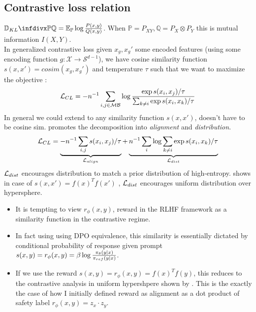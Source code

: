 \documentclass{article}
\begin{document}
\subsection{Contrastive loss relation}
$\infdiv{\mathbb{P}}{\mathbb{Q}}=\E_\mathbb{P}\log\frac{P(x,y)}{Q(x,y)}$. When $\mathbb{P}=P_{XY},\mathbb{Q}=P_X\otimes P_Y$ this is mutual information $I(X,Y)$.\\
In generalized contrastive loss given $x_g,x_g'$ some encoded features (using some encoding function $g:\mathcal{X}\to \mathcal{S}^{d-1}$), we have cosine similarity function $s(x,x')=cosim(x_g,x_g')$ and temperature $\tau$ such that we want to maximize the objective \citep{Chen2020IntriguingLosses}:
\begin{equation}
    \mathcal{L}_{CL}=-n^{-1}\sum_{i,j\in \mathcal{MB}}\log \frac{\exp s(x_i,x_j)/\tau}{\sum_{k\neq i}\exp s(x_i,x_k)/\tau}
\end{equation}
In general we could extend to any similarity function $s(x,x')$, doesn't have to be cosine sim.
\cite{Chen2020IntriguingLosses} promotes the decomposition into \emph{alignment} and \emph{distribution}.
\begin{equation}
    \mathcal{L}_{CL}=\underbrace{-n^{-1}\sum_{i,j}s(x_i,x_j)/\tau}_{\mathcal{L}_{align}} + \underbrace{n^{-1}\sum_i\log \sum_{k\neq i}\exp s(x_i,x_k)/\tau}_{\mathcal{L}_{dist}}
\end{equation}
$\mathcal{L}_{dist}$ encourages distribution to match a prior distribution of high-entropy. \cite{Wang2020UnderstandingHypersphere} shows in case of $s(x,x')=f(x)^Tf(x')$ , $\mathcal{L}_{dist}$ encourages uniform distribution over hypersphere.
\begin{remark}
\begin{itemize}
    \item  It is tempting to view $r_\phi(x,y)$, reward in the RLHF framework as a similarity function in the contrastive regime.  
    \item In fact using using DPO equivalence, this similarity is essentially dictated by conditional probability of response given prompt $s(x,y)=r_\phi(x,y)=\beta\log\frac{\pi_\theta(y|x)}{\pi_{ref}(y|x)}$.
    \item If we use the reward $s(x,y)=r_\phi(x,y)=f(x)^Tf(y)$, this reduces to the contrastive analysis in uniform hypershpere shown by \cite{Wang2020UnderstandingHypersphere}. This is the exactly the case of how I initially defined reward as alignment as a dot product of safety label $r_\phi(x,y)=z_x\cdot z_y$. 
\end{itemize}
   
\end{remark}
\end{document}
